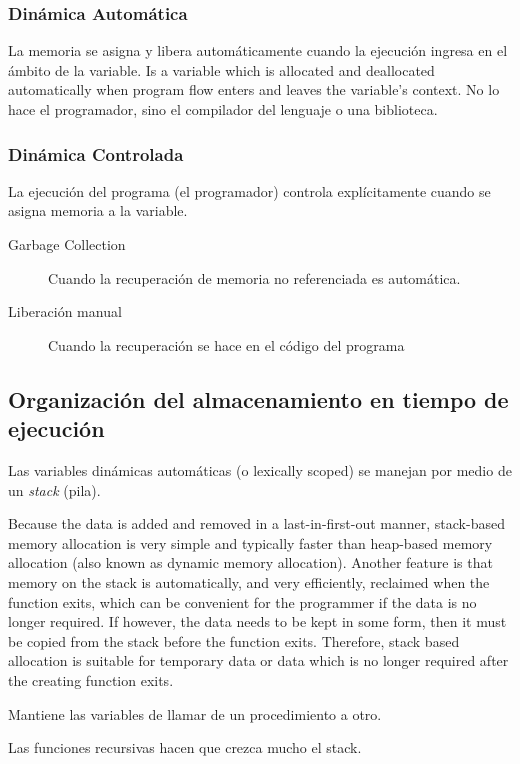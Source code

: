 \documentclass[a4paper, twoside]{article}
\begin{document}
\subsubsection{Dinámica Automática}

La memoria se asigna y libera automáticamente cuando la ejecución ingresa en el
ámbito de la variable.
Is a variable which is allocated and deallocated automatically when program
flow enters and leaves the variable's context.
No lo hace el programador, sino el compilador del lenguaje o una biblioteca.

\subsubsection{Dinámica Controlada}

La ejecución del programa (el programador) controla explícitamente cuando se
asigna memoria a la variable.
\begin{description}
  \item[Garbage Collection] Cuando la recuperación de memoria no referenciada
  es automática.
  \item[Liberación manual] Cuando la recuperación se hace en el código del
  programa
\end{description}

\subsection{Organización del almacenamiento en tiempo de ejecución}

Las variables dinámicas automáticas (o lexically scoped) se manejan por medio
de un \emph{stack} (pila).

Because the data is added and removed in a last-in-first-out manner,
stack-based memory allocation is very simple and typically faster than
heap-based memory allocation (also known as dynamic memory allocation).
Another feature is that memory on the stack is automatically, and very
efficiently, reclaimed when the function exits, which can be convenient for
the programmer if the data is no longer required.
If however, the data needs to be kept in some form, then it must be copied
from the stack before the function exits.
Therefore, stack based allocation is suitable for temporary data or data which
is no longer required after the creating function exits.

Mantiene las variables de llamar de un procedimiento a otro.

Las funciones recursivas hacen que crezca mucho el stack.
\end{document}
